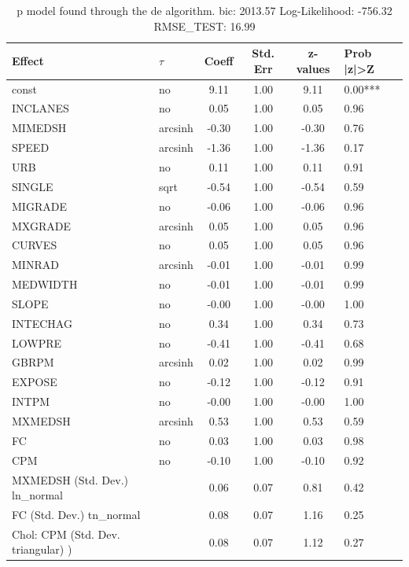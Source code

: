 \begin{table}
	\caption{p model found through the de algorithm. bic: 2013.57 Log-Likelihood: -756.32 RMSE_TEST: 16.99}
	\begin{center}
		\begin{tabular}{|l|l|c|c|c|l|}
			\hline
			Effect & $\tau$ & Coeff & Std. Err & z-values & Prob |z|>Z \\
			\hline
			const & no & 9.11 & 1.00 & 9.11 & 0.00*** \\
			\hline
			INCLANES & no & 0.05 & 1.00 & 0.05 & 0.96 \\
			\hline
			MIMEDSH & arcsinh & -0.30 & 1.00 & -0.30 & 0.76 \\
			\hline
			SPEED & arcsinh & -1.36 & 1.00 & -1.36 & 0.17 \\
			\hline
			URB & no & 0.11 & 1.00 & 0.11 & 0.91 \\
			\hline
			SINGLE & sqrt & -0.54 & 1.00 & -0.54 & 0.59 \\
			\hline
			MIGRADE & no & -0.06 & 1.00 & -0.06 & 0.96 \\
			\hline
			MXGRADE & arcsinh & 0.05 & 1.00 & 0.05 & 0.96 \\
			\hline
			CURVES & no & 0.05 & 1.00 & 0.05 & 0.96 \\
			\hline
			MINRAD & arcsinh & -0.01 & 1.00 & -0.01 & 0.99 \\
			\hline
			MEDWIDTH & no & -0.01 & 1.00 & -0.01 & 0.99 \\
			\hline
			SLOPE & no & -0.00 & 1.00 & -0.00 & 1.00 \\
			\hline
			INTECHAG & no & 0.34 & 1.00 & 0.34 & 0.73 \\
			\hline
			LOWPRE & no & -0.41 & 1.00 & -0.41 & 0.68 \\
			\hline
			GBRPM & arcsinh & 0.02 & 1.00 & 0.02 & 0.99 \\
			\hline
			EXPOSE & no & -0.12 & 1.00 & -0.12 & 0.91 \\
			\hline
			INTPM & no & -0.00 & 1.00 & -0.00 & 1.00 \\
			\hline
			MXMEDSH & arcsinh & 0.53 & 1.00 & 0.53 & 0.59 \\
			\hline
			FC & no & 0.03 & 1.00 & 0.03 & 0.98 \\
			\hline
			CPM & no & -0.10 & 1.00 & -0.10 & 0.92 \\
			\hline
			MXMEDSH (Std. Dev.) ln_normal &  & 0.06 & 0.07 & 0.81 & 0.42 \\
			\hline
			FC (Std. Dev.) tn_normal &  & 0.08 & 0.07 & 1.16 & 0.25 \\
			\hline
			 Chol: CPM (Std. Dev. triangular) ) &  & 0.08 & 0.07 & 1.12 & 0.27 \\
			\hline
		\end{tabular}
	\end{center}
\end{table}